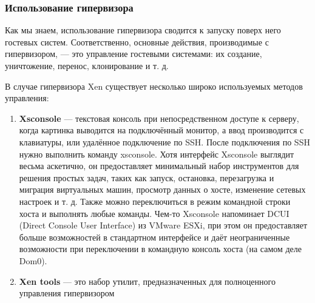 \documentclass[14pt, a4paper]{article}
\begin{document}
\subsubsection*{Использование гипервизора}


Как мы знаем, использование гипервизора сводится к запуску поверх него гостевых систем.
Соответственно, основные действия, производимые с гипервизором, — это управление гостевыми
системами: их создание, уничтожение, перенос, клонирование и т. д.

В случае гипервизора Xen существует несколько широко используемых методов управления:
\begin{enumerate}
    \item \textbf{Xsconsole} — текстовая консоль при непосредственном доступе к серверу, когда картинка
    выводится на подключённый монитор, а ввод производится с клавиатуры, или удалённое
    подключение по SSH. После подключения по SSH нужно выполнить команду xsconsole. Хотя
    интерфейс Xsconsole выглядит весьма аскетично, он предоставляет минимальный набор
    инструментов для решения простых задач, таких как запуск, остановка, перезагрузка и
    миграция виртуальных машин, просмотр данных о хосте, изменение сетевых настроек и т. д.
    Также можно переключиться в режим командной строки хоста и выполнять любые команды.
    Чем-то Xsconsole напоминает DCUI (Direct Console User Interface) из VMware ESXi, при этом он
    предоставляет больше возможностей в стандартном интерфейсе и даёт неограниченные
    возможности при переключении в командную консоль хоста (на самом деле Dom0).
    \begin{figure}[h]%
        \centering
        \label{2.2} %
    \end{figure}
    \item \textbf{Xen tools} — это набор утилит, предназначенных для полноценного управления гипервизором

\end{enumerate}
\end{document}
